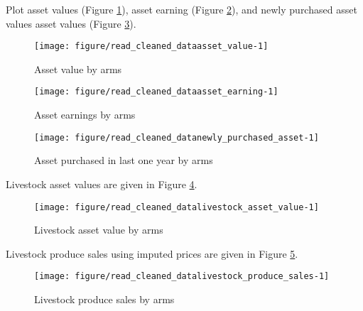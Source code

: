 Plot asset values (\textsf{\small Figure \ref{Figure asset value}}), asset earning (\textsf{\small Figure \ref{Figure asset earning}}), and newly purchased asset values asset values (\textsf{\small Figure \ref{Figure newly purchased asset}}).
\begin{Schunk}
\begin{figure}

{\centering \texttt{[image: figure/read\_cleaned\_dataasset\_value-1]} 

}

\caption[Asset value by arms]{Asset value by arms}\label{Figure asset value}
\end{figure}
\end{Schunk}
\begin{Schunk}
\begin{figure}

{\centering \texttt{[image: figure/read\_cleaned\_dataasset\_earning-1]} 

}

\caption[Asset earnings by arms]{Asset earnings by arms}\label{Figure asset earning}
\end{figure}
\end{Schunk}
\begin{Schunk}
\begin{figure}

{\centering \texttt{[image: figure/read\_cleaned\_datanewly\_purchased\_asset-1]} 

}

\caption[Asset purchased in last one year by arms]{Asset purchased in last one year by arms}\label{Figure newly purchased asset}
\end{figure}
\end{Schunk}


Livestock asset values are given in \textsf{\small Figure \ref{Figure livestock asset value}}.
\begin{Schunk}
\begin{figure}

{\centering \texttt{[image: figure/read\_cleaned\_datalivestock\_asset\_value-1]} 

}

\caption[Livestock asset value by arms]{Livestock asset value by arms}\label{Figure livestock asset value}
\end{figure}
\end{Schunk}
Livestock produce sales using imputed prices are given in \textsf{\small Figure \ref{Figure livestock produce sales}}.
\begin{Schunk}
\begin{figure}

{\centering \texttt{[image: figure/read\_cleaned\_datalivestock\_produce\_sales-1]} 

}

\caption[Livestock produce sales by arms]{Livestock produce sales by arms}\label{Figure livestock produce sales}
\end{figure}
\end{Schunk}

